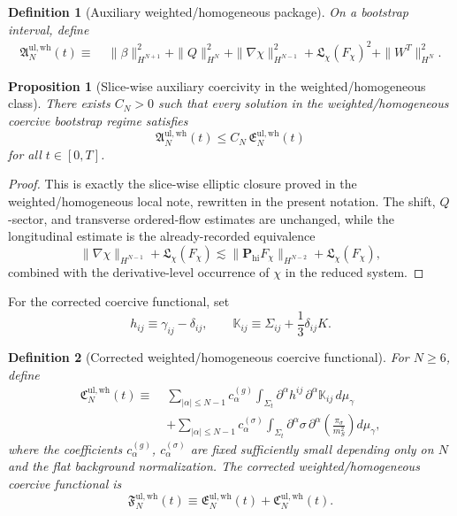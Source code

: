 \documentclass[11pt]{article}
\newtheorem{definition}{Definition}
\newtheorem{proposition}{Proposition}
\begin{document}
\begin{definition}[Auxiliary weighted/homogeneous package]
On a bootstrap interval, define
\begin{align}
\mathfrak A_N^{\mathrm{ul,wh}}(t)
\equiv\;&
\|\beta\|_{H^{N+1}}^2
+ \|Q\|_{H^N}^2
+ \|\nabla\chi\|_{H^{N-1}}^2
+ \mathfrak L_\chi(F_\chi)^2
+ \|W^T\|_{H^N}^2.
\label{eq:Awh}
\end{align}
\end{definition}

\begin{proposition}[Slice-wise auxiliary coercivity in the weighted/homogeneous class]
\label{prop:aux}
There exists \(C_N>0\) such that every solution in the weighted/homogeneous coercive bootstrap regime satisfies
\begin{equation}
\mathfrak A_N^{\mathrm{ul,wh}}(t)
\le
C_N\,\mathfrak E_N^{\mathrm{ul,wh}}(t)
\label{eq:auxcoercive}
\end{equation}
for all \(t\in[0,T]\).
\end{proposition}

\begin{proof}
This is exactly the slice-wise elliptic closure proved in the weighted/homogeneous local note, rewritten in the present notation. The shift, \(Q\)-sector, and transverse ordered-flow estimates are unchanged, while the longitudinal estimate is the already-recorded equivalence
\[
\|\nabla\chi\|_{H^{N-1}} + \mathfrak L_\chi(F_\chi)
\lesssim
\|\mathbf P_{\mathrm{hi}}F_\chi\|_{H^{N-2}}
+ \mathfrak L_\chi(F_\chi),
\]
combined with the derivative-level occurrence of \(\chi\) in the reduced system.
\end{proof}

For the corrected coercive functional, set
\begin{equation}
h_{ij}\equiv \gamma_{ij}-\delta_{ij},
\qquad
\mathbb K_{ij}\equiv \Sigma_{ij}+\frac13\delta_{ij}K.
\label{eq:hk}
\end{equation}

\begin{definition}[Corrected weighted/homogeneous coercive functional]
For \(N\ge 6\), define
\begin{align}
\mathfrak C_N^{\mathrm{ul,wh}}(t)
\equiv\;&
\sum_{|\alpha|\le N-1} c_\alpha^{(g)}
\int_{\Sigma_t}
\partial^\alpha h^{ij}\,
\partial^\alpha \mathbb K_{ij}\,d\mu_\gamma
\nonumber\\
&+
\sum_{|\alpha|\le N-1} c_\alpha^{(\sigma)}
\int_{\Sigma_t}
\partial^\alpha \sigma\,
\partial^\alpha\!\left(\frac{\pi_\sigma}{m_S^2}\right)d\mu_\gamma,
\label{eq:Cwh}
\end{align}
where the coefficients \(c_\alpha^{(g)}\), \(c_\alpha^{(\sigma)}\) are fixed sufficiently small depending only on \(N\) and the flat background normalization. The \emph{corrected weighted/homogeneous coercive functional} is
\begin{equation}
\mathfrak F_N^{\mathrm{ul,wh}}(t)
\equiv
\mathfrak E_N^{\mathrm{ul,wh}}(t)
+ \mathfrak C_N^{\mathrm{ul,wh}}(t).
\label{eq:Fwh}
\end{equation}
\end{definition}
\end{document}
